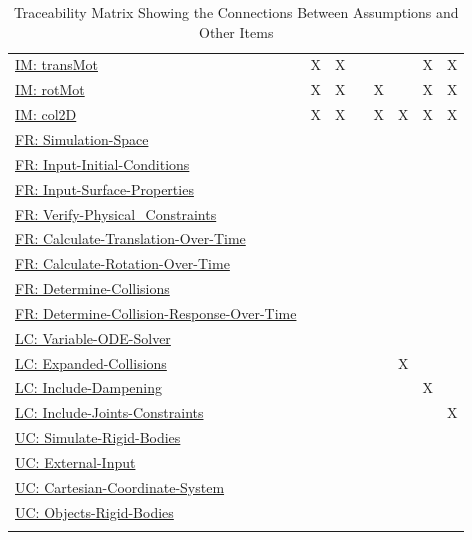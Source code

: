 \documentclass[12pt]{article}
\begin{document}
\begin{longtable}{l l l l l l l l}
\\
\hyperref[IM:transMot]{IM: transMot} & X & X &  &  &  & X & X
\\
\hyperref[IM:rotMot]{IM: rotMot} & X & X &  & X &  & X & X
\\
\hyperref[IM:col2D]{IM: col2D} & X & X &  & X & X & X & X
\\
\hyperref[simSpace]{FR: Simulation-Space} &  &  &  &  &  &  & 
\\
\hyperref[inputInitialConds]{FR: Input-Initial-Conditions} &  &  &  &  &  &  & 
\\
\hyperref[inputSurfaceProps]{FR: Input-Surface-Properties} &  &  &  &  &  &  & 
\\
\hyperref[verifyPhysCons]{FR: Verify-Physical\_Constraints} &  &  &  &  &  &  & 
\\
\hyperref[calcTransOverTime]{FR: Calculate-Translation-Over-Time} &  &  &  &  &  &  & 
\\
\hyperref[calcRotOverTime]{FR: Calculate-Rotation-Over-Time} &  &  &  &  &  &  & 
\\
\hyperref[deterColls]{FR: Determine-Collisions} &  &  &  &  &  &  & 
\\
\hyperref[deterCollRespOverTime]{FR: Determine-Collision-Response-Over-Time} &  &  &  &  &  &  & 
\\
\hyperref[lcVODES]{LC: Variable-ODE-Solver} &  &  &  &  &  &  & 
\\
\hyperref[lcEC]{LC: Expanded-Collisions} &  &  &  &  & X &  & 
\\
\hyperref[lcID]{LC: Include-Dampening} &  &  &  &  &  & X & 
\\
\hyperref[lcIJC]{LC: Include-Joints-Constraints} &  &  &  &  &  &  & X
\\
\hyperref[ucSRB]{UC: Simulate-Rigid-Bodies} &  &  &  &  &  &  & 
\\
\hyperref[ucEI]{UC: External-Input} &  &  &  &  &  &  & 
\\
\hyperref[ucCCS]{UC: Cartesian-Coordinate-System} &  &  &  &  &  &  & 
\\
\hyperref[ucORB]{UC: Objects-Rigid-Bodies} &  &  &  &  &  &  & 
\\
\bottomrule
\caption{Traceability Matrix Showing the Connections Between Assumptions and Other Items}
\label{Table:TraceMatAvsAll}
\end{longtable}
\end{document}
